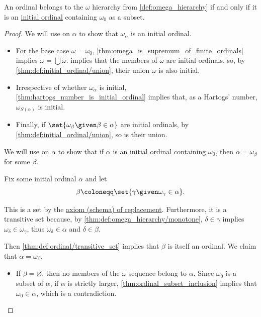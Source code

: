 \begin{proposition}\label{thm:omega_hierarchy_ordinals_iff_initial}
  An ordinal belongs to the \( \omega \) hierarchy from \cref{def:omega_hierarchy} if and only if it is an \hyperref[def:initial_ordinal]{initial ordinal} containing \( \omega_0 \) as a subset.
\end{proposition}
\begin{proof}
  \SufficiencySubProof We will use  on \( \alpha \) to show that \( \omega_\alpha \) is an initial ordinal.
  \begin{itemize}
    \item For the base case \( \omega = \omega_0 \), \cref{thm:omega_is_supremum_of_finite_ordinals} implies \( \omega = \bigcup \omega \).  implies that the members of \( \omega \) are initial ordinals, so, by \cref{thm:def:initial_ordinal/union}, their union \( \omega \) is also initial.

    \item Irrespective of whether \( \omega_\alpha \) is initial, \cref{thm:hartogs_number_is_initial_ordinal} implies that, as a Hartogs' number, \( \omega_{S(\alpha)} \) is initial.

    \item Finally, if \( \set{ \omega_\beta \given \beta \in \alpha } \) are initial ordinals, by \cref{thm:def:initial_ordinal/union}, so is their union.
  \end{itemize}

  \NecessitySubProof We will use  on \( \alpha \) to show that if \( \alpha \) is an initial ordinal containing \( \omega_0 \), then \( \alpha = \omega_\beta \) for some \( \beta \).

  Fix some initial ordinal \( \alpha \) and let
  \begin{equation*}
    \beta \coloneqq \set{ \gamma \given \omega_\gamma \in \alpha }.
  \end{equation*}

  This is a set by the \hyperref[def:zfc/replacement]{axiom (schema) of replacement}. Furthermore, it is a transitive set because, by \cref{thm:def:omega_hierarchy/monotone}, \( \delta \in \gamma \) implies \( \omega_\delta \in \omega_\gamma \), thus \( \omega_\delta \in \alpha \) and \( \delta \in \beta \).

  Then \cref{thm:def:ordinal/transitive_set} implies that \( \beta \) is itself an ordinal. We claim that \( \alpha = \omega_\beta \).
  \begin{itemize}
    \item If \( \beta = \varnothing \), then no members of the \( \omega \) sequence belong to \( \alpha \). Since \( \omega_0 \) is a subset of \( \alpha \), if \( \alpha \) is strictly larger, \cref{thm:ordinal_subset_inclusion} implies that \( \omega_0 \in \alpha \), which is a contradiction.


\end{itemize}
\end{proof}
